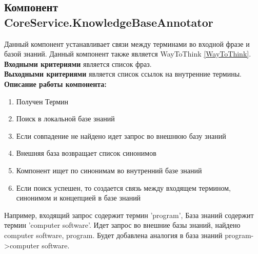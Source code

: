 \subsection{Компонент CoreService.KnowledgeBaseAnnotator} \label{KnowledgeBaseAnnotator}
Данный компонент устанавливает связи между терминами во входной фразе и базой знаний. Данный компонент также является WayToThink \ref{WayToThink}.  \\
\textbf{Входными критериями} является список фраз. \\
\textbf{Выходными критериями} является список ссылок на внутренние термины. \\
\textbf{Описание работы компонента:}
\begin{enumerate}
	\item Получен Термин
	\item Поиск в локальной базе знаний
	\item Если совпадение не найдено идет запрос во внешнюю базу знаний
	\item Внешняя база возвращает список синонимов
	\item Компонент ищет по синонимам во внутренний базе знаний
	\item Если поиск успешен, то создается связь между входящем термином, синонимом и концепцией в базе знаний
\end{enumerate}
Например, входящий запрос содержит термин 'program', База знаний содержит термин 'computer software'. Идет запрос во внешние базы знаний, найдено computer software, program. Будет добавлена аналогия в база знаний program->computer software. 

\clearpage

